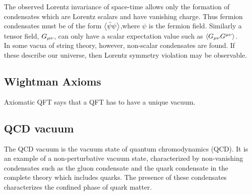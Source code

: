 The observed Lorentz invariance of space-time allows only the formation of condensates which are Lorentz scalars and have vanishing charge. Thus fermion condensates must be of the form $\expval{\bar{ \psi}\psi}$,where $\psi$ is the fermion field. Similarly a tensor field, $G_{\mu \nu}$, can only have a scalar expectation value such as $\expval{G_{\mu \nu}G^{\mu \nu}}$.\\
In some vacua of string theory, however, non-scalar condensates are found. If these describe our universe, then Lorentz symmetry violation may be observable.

\subsection{Wightman Axioms}
Axiomatic QFT says that a QFT has to have a unique vacuum.
\subsection{QCD vacuum}
The QCD vacuum is the vacuum state of quantum chromodynamics (QCD). It is an example of a non-perturbative vacuum state, characterized by non-vanishing condensates such as the gluon condensate and the quark condensate in the complete theory which includes quarks. The presence of these condensates characterizes the confined phase of quark matter.
